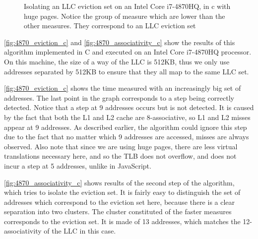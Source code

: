 \documentclass[a4paper,11pt,oneside]{report}
\begin{document}
\begin{figure}
    \centering
    \caption{Isolating an LLC eviction set on an Intel Core i7-4870HQ, in c with huge pages. Notice the group of measure which are lower than the other measures. They correspond to an LLC eviction set}
    \label{fig:4870_associativity_c}
\end{figure}

\autoref{fig:4870_eviction_c} and \autoref{fig:4870_associativity_c} show the results of this algorithm implemented in C and executed on an Intel Core i7-4870HQ processor. On this machine, the size of a way of the LLC is 512KB, thus we only use addresses separated by 512KB to ensure that they all map to the same LLC set.

\autoref{fig:4870_eviction_c} shows the time measured with an increasingly big set of addresses. The last point in the graph corresponds to a step being correctly detected. Notice that a step at 9 addresses occurs but is not detected. It is caused by the fact that both the L1 and L2 cache are 8-associative, so L1 and L2 misses appear at 9 addresses. As described earlier, the algorithm could ignore this step due to the fact that no matter which 9 addresses are accessed, misses are always observed. Also note that since we are using huge pages, there are less virtual translations necessary here, and so the TLB does not overflow, and does not incur a step at 5 addresses, unlike in JavaScript.

\autoref{fig:4870_associativity_c} shows results of the second step of the algorithm, which tries to isolate the eviction set. It is fairly easy to distinguish the set of addresses which correspond to the eviction set here, because there is a clear separation into two clusters. The cluster constituted of the faster measures corresponds to the eviction set. It is made of 13 addresses, which matches the 12-associativity of the LLC in this case.
\end{document}
